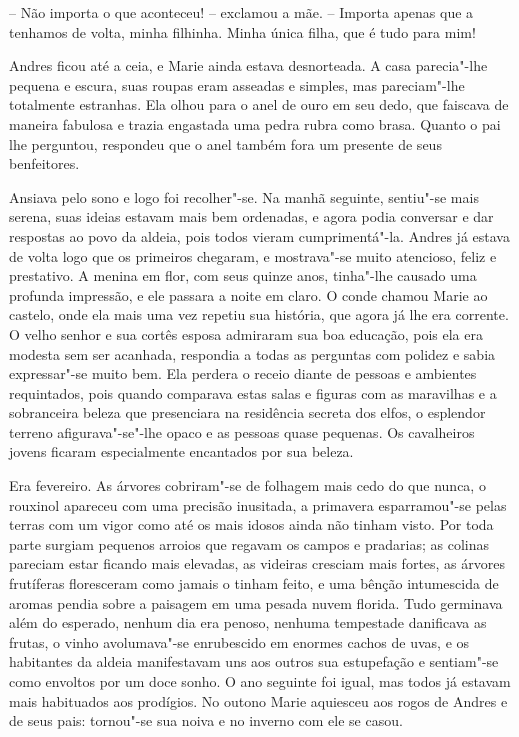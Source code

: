 -- Não importa o que aconteceu! -- exclamou a mãe. -- Importa apenas que
a tenhamos de volta, minha filhinha. Minha única filha, que é tudo para mim!

Andres ficou até a ceia, e Marie ainda estava desnorteada. A casa
parecia"-lhe pequena e escura, suas roupas eram asseadas e simples, mas
pareciam"-lhe totalmente estranhas. Ela olhou para o anel de ouro em seu
dedo, que faiscava de maneira fabulosa e trazia engastada uma pedra
rubra como brasa. Quanto o pai lhe perguntou, respondeu que o anel
também fora um presente de seus benfeitores.

Ansiava pelo sono e logo foi recolher"-se. Na manhã seguinte, sentiu"-se
mais serena, suas ideias estavam mais bem ordenadas, e agora podia
conversar e dar respostas ao povo da aldeia, pois todos vieram
cumprimentá"-la. Andres já estava de volta logo que os primeiros
chegaram, e mostrava"-se muito atencioso, feliz e prestativo. A menina
em flor, com seus quinze anos, tinha"-lhe causado uma profunda
impressão, e ele passara a noite em claro. O conde chamou Marie ao
castelo, onde ela mais uma vez repetiu sua história, que agora já lhe
era corrente. O velho senhor e sua cortês esposa admiraram sua boa
educação, pois ela era modesta sem ser acanhada, respondia a todas as
perguntas com polidez e sabia expressar"-se muito bem. Ela perdera o
receio diante de pessoas e ambientes requintados, pois quando comparava
estas salas e figuras com as maravilhas e a sobranceira beleza que
presenciara na residência secreta dos elfos, o esplendor terreno
afigurava"-se"-lhe opaco e as pessoas quase pequenas. Os cavalheiros
jovens ficaram especialmente encantados por sua beleza. 

Era fevereiro. As árvores cobriram"-se de folhagem mais cedo do que nunca, 
o rouxinol apareceu com uma precisão inusitada, a primavera
esparramou"-se pelas terras com um vigor como até os mais idosos ainda
não tinham visto. Por toda parte surgiam pequenos arroios que regavam
os campos e pradarias; as colinas pareciam estar ficando mais elevadas,
as videiras cresciam mais fortes, as árvores frutíferas floresceram
como jamais o tinham feito, e uma bênção intumescida de aromas pendia
sobre a paisagem em uma pesada nuvem \mbox{florida}. Tudo germinava além do
esperado, nenhum dia era penoso, nenhuma tempestade danificava as
frutas, o vinho avolumava"-se enrubescido em enormes cachos de uvas, e
os habitantes da aldeia manifestavam uns aos outros sua estupefação e
sentiam"-se como envoltos por um doce sonho. O ano seguinte foi igual,
mas todos já estavam mais habituados aos prodígios. No outono Marie
aquiesceu aos rogos de Andres e de seus pais: tornou"-se sua noiva e no
inverno com ele se casou.

